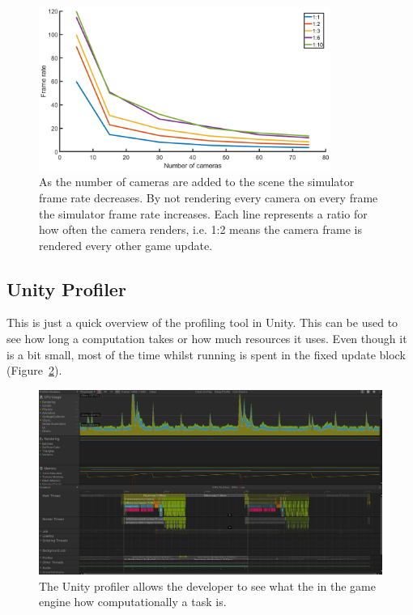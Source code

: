 \begin{figure}[H]
    \centering
    \includegraphics[width=0.85\textwidth]{06_Implementation/00_AirSim/Diagrams/frameRates.png}
    \caption[AirSim tick rates]{As the number of cameras are added to the scene the simulator frame rate decreases. By not rendering every camera on every frame the simulator frame rate increases. Each line represents a ratio for how often the camera renders, i.e. 1:2 means the camera frame is rendered every other game update.} \label{06:frameRates}
\end{figure}


\subsection{Unity Profiler}
This is just a quick overview of the profiling tool in Unity. This can be used to see how long a computation takes or how much resources it uses. Even though it is a bit small, most of the time whilst running is spent in the fixed update block (Figure~\ref{08:profiler}). 
\begin{figure}[H]
    \centering
    \includegraphics[width=1\textwidth]{08_Results/UnityProfiler.JPG}
    \caption[Unity Profiler]{The Unity profiler allows the developer to see what the in the game engine how computationally a task is.} \label{08:profiler}
\end{figure}


